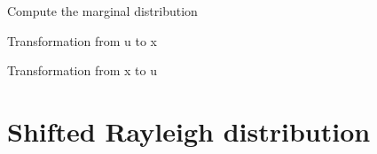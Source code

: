 \documentclass[letterpaper,10pt,english]{sphinxmanual}
\begin{document}
\begin{fulllineitems}
\begin{fulllineitems}
\end{fulllineitems}



\begin{fulllineitems}
Compute the marginal distribution

\end{fulllineitems}



\begin{fulllineitems}
Transformation from u to x

\end{fulllineitems}



\begin{fulllineitems}
Transformation from x to u

\end{fulllineitems}


\end{fulllineitems}



\section{Shifted Rayleigh distribution}
\label{distributions:shifted-rayleigh-distribution}
\end{document}
